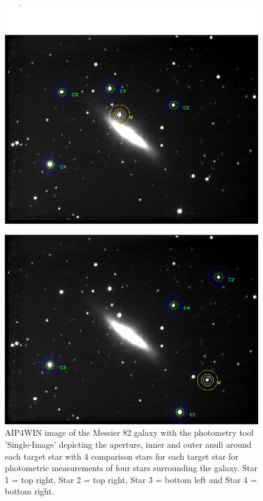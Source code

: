 \documentclass[12pt]{article}
\begin{document}
\begin{figure}[H]
\begin{multicols}{2}
\begin{minipage}[H]{0.5\textwidth}
\includegraphics[scale=0.43]{Images/AsImages/SI/Sr2-Aperture.PNG} \\ 
\end{minipage}
\begin{minipage}[H]{0.5\textwidth}
\includegraphics[scale=0.43]{Images/AsImages/SI/Sr4-Aperture.PNG}
\end{minipage}
\end{multicols}
\caption{AIP4WIN image of the Messier 82 galaxy with the photometry tool 'Single-Image' depicting the aperture, inner and outer anuli around each target star with 4 comparison stars for each target star for photometric measurements of four stars surrounding the galaxy. Star 1 = top right, Star 2 = top right, Star 3 = bottom left and Star 4 = bottom right.}
\label{SI-Aperture}
\end{figure}
\end{document}
